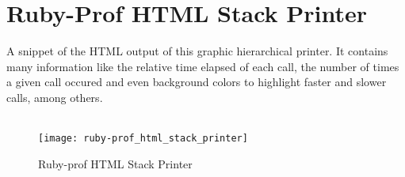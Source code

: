 \chapter{Ruby-Prof HTML Stack Printer} %
\label{ap:ruby-prof_html_stack_printer}

A snippet of the HTML output of this graphic hierarchical printer. It contains many information like the relative time elapsed of each call, the number of times a given call occured and even background colors to highlight faster and slower calls, among others.\\\\

\begin{figure}[h]
  \centering
    \texttt{[image: ruby-prof\_html\_stack\_printer]}
    \caption{Ruby-prof HTML Stack Printer} \label{fig:ruby-prof_html_stack_printer}
\end{figure}
